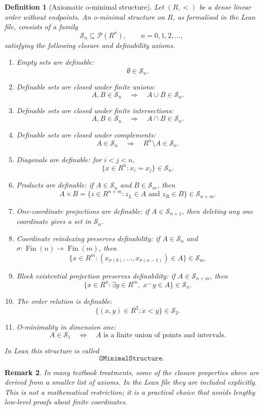 \documentclass[11pt]{article}
\newtheorem{definition}{Definition}[section]
\newtheorem{remark}[definition]{Remark}
\newcommand{\Sfam}{\mathcal S}
\newcommand{\cat}{\mathbin{{}^\frown}}
\newcommand{\Lean}[1]{\texttt{#1}}
\begin{document}
\begin{definition}[Axiomatic o-minimal structure]
Let $(R,<)$ be a dense linear order without endpoints.  An o-minimal structure on $R$, as formalised
in the Lean file, consists of a family
\[
  \Sfam_n\subseteq \mathcal P(R^n),
  \qquad n=0,1,2,\ldots,
\]
satisfying the following closure and definability axioms.
\begin{enumerate}[label=(\roman*)]
  \item Empty sets are definable:
  \[
    \emptyset\in\Sfam_n.
  \]
  \item Definable sets are closed under finite unions:
  \[
    A,B\in\Sfam_n\quad\Longrightarrow\quad A\cup B\in\Sfam_n.
  \]
  \item Definable sets are closed under finite intersections:
  \[
    A,B\in\Sfam_n\quad\Longrightarrow\quad A\cap B\in\Sfam_n.
  \]
  \item Definable sets are closed under complements:
  \[
    A\in\Sfam_n\quad\Longrightarrow\quad R^n\setminus A\in\Sfam_n.
  \]
  \item Diagonals are definable: for $i<j<n$,
  \[
    \{x\in R^n:x_i=x_j\}\in\Sfam_n.
  \]
  \item Products are definable: if $A\in\Sfam_n$ and $B\in\Sfam_m$, then
  \[
    A\times B
    =\{z\in R^{n+m}:z_L\in A\text{ and }z_R\in B\}
    \in\Sfam_{n+m}.
  \]
  \item One-coordinate projections are definable: if $A\in\Sfam_{n+1}$, then deleting any one
  coordinate gives a set in $\Sfam_n$.
  \item Coordinate reindexing preserves definability: if $A\in\Sfam_n$ and
  $\sigma:\operatorname{Fin}(n)\to\operatorname{Fin}(m)$, then
  \[
    \{x\in R^m:(x_{\sigma(0)},\ldots,x_{\sigma(n-1)})\in A\}
    \in\Sfam_m.
  \]
  \item Block existential projection preserves definability: if $A\in\Sfam_{n+m}$, then
  \[
    \{x\in R^n:\exists y\in R^m,\;x\cat y\in A\}
    \in\Sfam_n.
  \]
  \item The order relation is definable:
  \[
    \{(x,y)\in R^2:x<y\}
    \in\Sfam_2.
  \]
  \item O-minimality in dimension one:
  \[
    A\in\Sfam_1
    \quad\Longleftrightarrow\quad
    A\text{ is a finite union of points and intervals.}
  \]
\end{enumerate}
In Lean this structure is called
\[
  \Lean{OMinimalStructure}.
\]
\end{definition}

\begin{remark}
In many textbook treatments, some of the closure properties above are derived from a smaller list of
axioms.  In the Lean file they are included explicitly.  This is not a mathematical restriction; it is
a practical choice that avoids lengthy low-level proofs about finite coordinates.
\end{remark}
\end{document}
